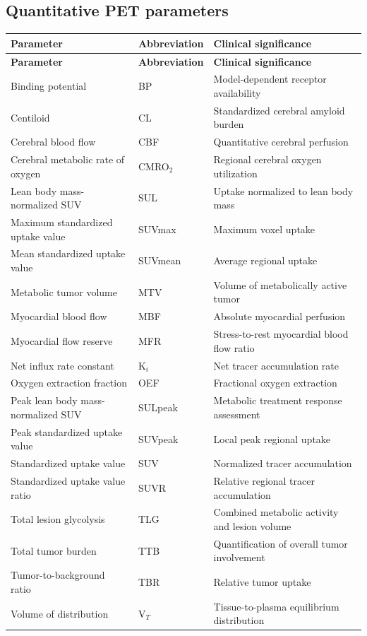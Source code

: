 \subsection{Quantitative PET parameters}
\begin{longtable}{@{}p{}p{}p{}@{}}
\toprule
\textbf{Parameter} & \textbf{Abbreviation} & \textbf{Clinical significance} \\
\midrule
\endfirsthead
\toprule
\textbf{Parameter} & \textbf{Abbreviation} & \textbf{Clinical significance} \\
\midrule
\endhead
Binding potential & BP & Model-dependent receptor availability \\
Centiloid & CL & Standardized cerebral amyloid burden \\
Cerebral blood flow & CBF & Quantitative cerebral perfusion \\
Cerebral metabolic rate of oxygen & CMRO$_2$ & Regional cerebral oxygen utilization \\
Lean body mass-normalized SUV & SUL & Uptake normalized to lean body mass \\
Maximum standardized uptake value & SUVmax & Maximum voxel uptake \\
Mean standardized uptake value & SUVmean & Average regional uptake \\
Metabolic tumor volume & MTV & Volume of metabolically active tumor \\
Myocardial blood flow & MBF & Absolute myocardial perfusion \\
Myocardial flow reserve & MFR & Stress-to-rest myocardial blood flow ratio \\
Net influx rate constant & K$_i$ & Net tracer accumulation rate \\
Oxygen extraction fraction & OEF & Fractional oxygen extraction \\
Peak lean body mass-normalized SUV & SULpeak & Metabolic treatment response assessment \\
Peak standardized uptake value & SUVpeak & Local peak regional uptake \\
Standardized uptake value & SUV & Normalized tracer accumulation \\
Standardized uptake value ratio & SUVR & Relative regional tracer accumulation \\
Total lesion glycolysis & TLG & Combined metabolic activity and lesion volume \\
Total tumor burden & TTB & Quantification of overall tumor involvement \\
Tumor-to-background ratio & TBR & Relative tumor uptake \\
Volume of distribution & V$_T$ & Tissue-to-plasma equilibrium distribution \\
\bottomrule
\end{longtable}

